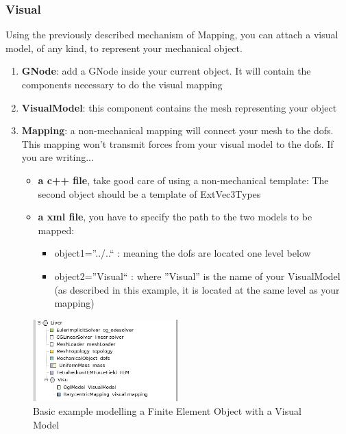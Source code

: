 \subsubsection{Visual}
Using the previously described mechanism of Mapping, you can attach a visual model, of any kind, to represent your mechanical object.

\begin{enumerate}
 \item { \bf GNode}: add a GNode inside your current object. It will contain the components necessary to do the visual mapping
 \item { \bf VisualModel}: this component contains the mesh representing your object
 \item { \bf Mapping}: a non-mechanical mapping will connect your mesh to the dofs. This mapping won't transmit forces from your visual model to the dofs. If you are writing...
\begin{itemize}
 \item { \bf a c++ file}, take good care of using a non-mechanical template: The second object should be a template of ExtVec3Types
 \item { \bf a xml file}, you have to specify the path to the two models to be mapped: 
\begin{itemize}
 \item object1=''../..`` : meaning the dofs are located one level below
 \item object2=''Visual`` : where ''Visual'' is the name of your VisualModel (as described in this example, it is located at the same level as your mapping)
\end{itemize}
\end{itemize}
 
\end{enumerate}

\begin{figure}[htpb]
	\centering
		\includegraphics[width=0.5\textwidth]{Modelling1.jpg}
	\caption{Basic example modelling a Finite Element Object with a Visual Model}
\end{figure}
